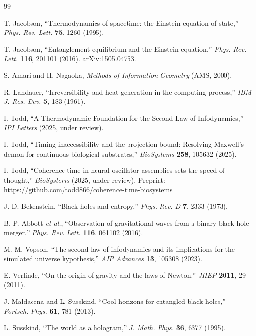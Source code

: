 \documentclass[11pt,a4paper]{article}
\begin{document}
\begin{thebibliography}{99}

T. Jacobson, ``Thermodynamics of spacetime: the Einstein equation of state,'' \textit{Phys. Rev. Lett.} \textbf{75}, 1260 (1995).

T. Jacobson, ``Entanglement equilibrium and the Einstein equation,'' \textit{Phys. Rev. Lett.} \textbf{116}, 201101 (2016). arXiv:1505.04753.

S. Amari and H. Nagaoka, \textit{Methods of Information Geometry} (AMS, 2000).

R. Landauer, ``Irreversibility and heat generation in the computing process,'' \textit{IBM J. Res. Dev.} \textbf{5}, 183 (1961).

I. Todd, ``A Thermodynamic Foundation for the Second Law of Infodynamics,'' \textit{IPI Letters} (2025, under review).

I. Todd, ``Timing inaccessibility and the projection bound: Resolving Maxwell's demon for continuous biological substrates,'' \textit{BioSystems} \textbf{258}, 105632 (2025).

I. Todd, ``Coherence time in neural oscillator assemblies sets the speed of thought,'' \textit{BioSystems} (2025, under review). Preprint: \url{https://github.com/todd866/coherence-time-biosystems}

J. D. Bekenstein, ``Black holes and entropy,'' \textit{Phys. Rev. D} \textbf{7}, 2333 (1973).

B. P. Abbott \textit{et al.}, ``Observation of gravitational waves from a binary black hole merger,'' \textit{Phys. Rev. Lett.} \textbf{116}, 061102 (2016).

M. M. Vopson, ``The second law of infodynamics and its implications for the simulated universe hypothesis,'' \textit{AIP Advances} \textbf{13}, 105308 (2023).

E. Verlinde, ``On the origin of gravity and the laws of Newton,'' \textit{JHEP} \textbf{2011}, 29 (2011).

J. Maldacena and L. Susskind, ``Cool horizons for entangled black holes,'' \textit{Fortsch. Phys.} \textbf{61}, 781 (2013).

L. Susskind, ``The world as a hologram,'' \textit{J. Math. Phys.} \textbf{36}, 6377 (1995).

\end{thebibliography}
\end{document}
